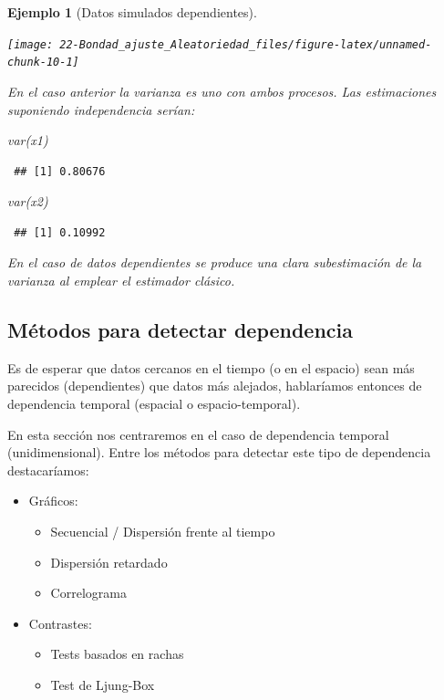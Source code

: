 \documentclass[
  10pt,
]{book}
\newenvironment{Shaded}{\begin{snugshade}}{\end{snugshade}}
\newcommand{\FunctionTok}[1]{\textcolor[rgb]{0.00,0.00,0.00}{#1}}
\newcommand{\NormalTok}[1]{#1}
\theoremstyle{break}
\newtheorem{example}{Ejemplo}[chapter]
\theoremstyle{nonumberplain}
\begin{document}
\begin{example}[Datos simulados dependientes]
\begin{center}\texttt{[image: 22-Bondad\_ajuste\_Aleatoriedad\_files/figure-latex/unnamed-chunk-10-1]} \end{center}

En el caso anterior la varianza es uno con ambos procesos.
Las estimaciones suponiendo independencia serían:

\begin{Shaded}
\begin{Highlighting}[]
\FunctionTok{var}\NormalTok{(x1)}
\end{Highlighting}
\end{Shaded}

\begin{verbatim}
 ## [1] 0.80676
\end{verbatim}

\begin{Shaded}
\begin{Highlighting}[]
\FunctionTok{var}\NormalTok{(x2)}
\end{Highlighting}
\end{Shaded}

\begin{verbatim}
 ## [1] 0.10992
\end{verbatim}

En el caso de datos dependientes se produce una clara subestimación de la varianza al emplear el estimador clásico.
\end{example}

\hypertarget{muxe9todos-para-detectar-dependencia}{%
\subsection{Métodos para detectar dependencia}\label{muxe9todos-para-detectar-dependencia}}

Es de esperar que datos cercanos en el tiempo (o en el espacio)
sean más parecidos (dependientes) que datos más alejados, hablaríamos entonces de dependencia temporal (espacial o espacio-temporal).

En esta sección nos centraremos en el caso de dependencia temporal (unidimensional).
Entre los métodos para detectar este tipo de dependencia destacaríamos:

\begin{itemize}
\item
  Gráficos:

  \begin{itemize}
  \item
    Secuencial / Dispersión frente al tiempo
  \item
    Dispersión retardado
  \item
    Correlograma
  \end{itemize}
\item
  Contrastes:

  \begin{itemize}
  \item
    Tests basados en rachas
  \item
    Test de Ljung-Box
  \end{itemize}
\end{itemize}
\end{document}
